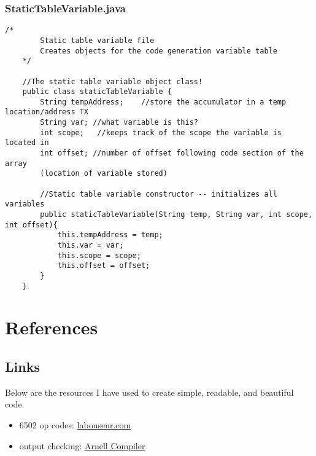 \documentclass[letterpaper, 10pt,DIV=13]{scrartcl}
\numberwithin{equation}{section} %
\numberwithin{figure}{section} %
\numberwithin{table}{section} %
\begin{document}
\subsubsection*{StaticTableVariable.java}
    \lstset{numbers=left, numberstyle=\tiny, stepnumber=1, numbersep=5pt, basicstyle=\footnotesize\ttfamily}
    \begin{lstlisting}[frame=single, ]
    /*
        Static table variable file
        Creates objects for the code generation variable table
    */
    
    //The static table variable object class!
    public class staticTableVariable {
        String tempAddress;    //store the accumulator in a temp location/address TX
        String var; //what variable is this?
        int scope;   //keeps track of the scope the variable is located in
        int offset; //number of offset following code section of the array 
        (location of variable stored)
    
        //Static table variable constructor -- initializes all variables
        public staticTableVariable(String temp, String var, int scope, int offset){
            this.tempAddress = temp;
            this.var = var;
            this.scope = scope;
            this.offset = offset;
        }
    }
    \end{lstlisting}

\pagebreak

\section*{References}

\subsection*{Links}
Below are the resources I have used to create simple, readable, and beautiful code.

\begin{itemize}
    \item 6502 op codes: \href{https://www.labouseur.com/commondocs/6502alan-instruction-set.pdf}{labouseur.com}
    \item output checking: \href{https://www.labouseur.com/courses/compilers/compilers/arnell/dist/index.html}{Arnell Compiler}
\end{itemize}

\pagebreak

% 
\end{document}
